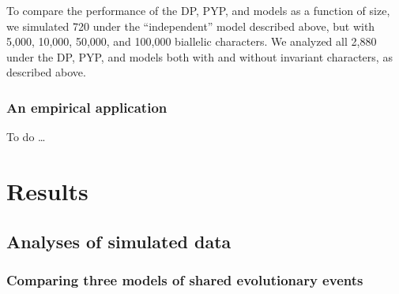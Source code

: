 \documentclass[letterpaper,12pt]{article}
\begin{document}
To compare the performance of the DP, PYP, and \wunif models as a function of
\dataset size, we simulated 720
\datasets under the ``independent'' model described above, but
with 5,000, 10,000, 50,000, and 100,000 biallelic characters.
We analyzed all 2,880 \datasets under the DP, PYP, and \wunif models
both with and without invariant characters, as
described above.

\subsubsection{An empirical application}

To do \ldots

\section{Results}

\subsection{Analyses of simulated data}

\subsubsection{Comparing three models of shared evolutionary events}
\end{document}
